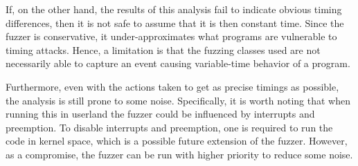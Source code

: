 If, on the other hand, the results of this analysis fail to indicate obvious timing differences, then it is not safe to assume that it is then constant time. 
Since the fuzzer is conservative, it under-approximates what programs are vulnerable to timing attacks.
Hence, a limitation is that the fuzzing classes used are not necessarily able to capture an event causing variable-time behavior of a program. 

Furthermore, even with the actions taken to get as precise timings as possible, the analysis is still prone to some noise. 
Specifically, it is worth noting that when running this in userland the fuzzer could be influenced by interrupts and preemption. 
To disable interrupts and preemption, one is required to run the code in kernel space, which is a possible future extension of the fuzzer. 
However, as a compromise, the fuzzer can be run with higher priority to reduce some noise. 
